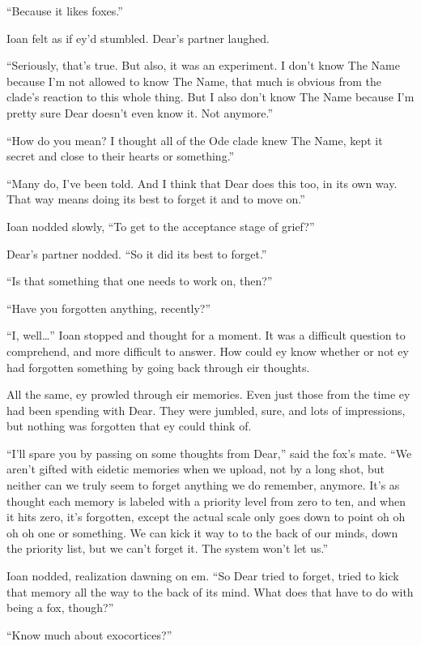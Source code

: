 ``Because it likes foxes.''

Ioan felt as if ey'd stumbled. Dear's partner laughed.

``Seriously, that's true. But also, it was an experiment. I don't know The Name because I'm not allowed to know The Name, that much is obvious from the clade's reaction to this whole thing. But I also don't know The Name because I'm pretty sure Dear doesn't even know it. Not anymore.''

``How do you mean? I thought all of the Ode clade knew The Name, kept it secret and close to their hearts or something.''

``Many do, I've been told. And I think that Dear does this too, in its own way. That way means doing its best to forget it and to move on.''

Ioan nodded slowly, ``To get to the acceptance stage of grief?''

Dear's partner nodded. ``So it did its best to forget.''

``Is that something that one needs to work on, then?''

``Have you forgotten anything, recently?''

``I, well\ldots{}'' Ioan stopped and thought for a moment. It was a difficult question to comprehend, and more difficult to answer. How could ey know whether or not ey had forgotten something by going back through eir thoughts.

All the same, ey prowled through eir memories. Even just those from the time ey had been spending with Dear. They were jumbled, sure, and lots of impressions, but nothing was forgotten that ey could think of.

``I'll spare you by passing on some thoughts from Dear,'' said the fox's mate. ``We aren't gifted with eidetic memories when we upload, not by a long shot, but neither can we truly seem to forget anything we do remember, anymore. It's as thought each memory is labeled with a priority level from zero to ten, and when it hits zero, it's forgotten, except the actual scale only goes down to point oh oh oh oh one or something. We can kick it way to to the back of our minds, down the priority list, but we can't forget it. The system won't let us.''

Ioan nodded, realization dawning on em. ``So Dear tried to forget, tried to kick that memory all the way to the back of its mind. What does that have to do with being a fox, though?''

``Know much about exocortices?''


